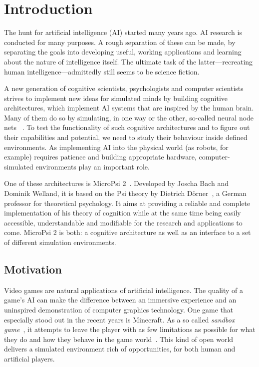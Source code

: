 \chapter{Introduction}
\label{chap:1}

The hunt for artificial intelligence (AI) started many years ago. AI research is conducted for many purposes. A rough separation of these can be made, by separating the goals into developing useful, working applications and learning about the nature of intelligence itself. The ultimate task of the latter---recreating human intelligence---admittedly still seems to be science fiction.

A new generation of cognitive scientists, psychologists and computer scientists strives to implement new ideas for simulated minds by building cognitive architectures, which implement AI systems that are inspired by the human brain. Many of them do so by simulating, in one way or the other, so-called neural node nets ~\cite{Goertzel201030}. To test the functionality of such cognitive architectures and to figure out their capabilities and potential, we need to study their behaviour inside defined environments. As implementing AI into the physical world (as robots, for example) requires patience and building appropriate hardware, computer-simulated environments play an important role.

One of these architectures is MicroPsi 2~\cite{conf/agi/Bach12}. Developed by Joscha Bach and Dominik Welland, it is based on the Psi theory by Dietrich Dörner~\cite{Doerner1998}, a German professor for theoretical psychology. It aims at providing a reliable and complete implementation of his theory of cognition while at the same time being easily accessible, understandable and modifiable for the research and applications to come. MicroPsi 2 is both: a cognitive architecture as well as an interface to a set of different simulation environments.

\section{Motivation}

Video games are natural applications of artificial intelligence. The quality of a game's AI can make the difference between an immersive experience and an uninspired demonstration of computer graphics technology. One game that especially stood out in the recent years is Minecraft. As a so called \emph{sandbox game}~\cite{Duncan:2011:MBC:2207096.2207097}, it attempts to leave the player with as few limitations as possible for what they do and how they behave in the game world~\cite{doi:10.1162/dmal.9780262693646.167}. This kind of open world delivers a simulated environment rich of opportunities, for both human and artificial players. 

